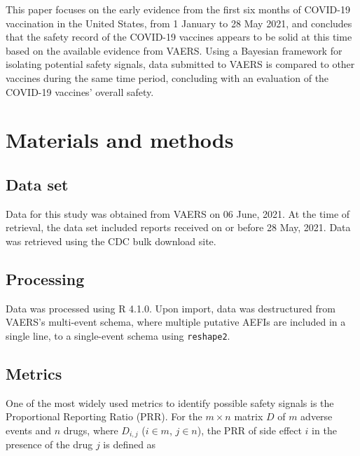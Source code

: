 \documentclass[preprints,communication,submit,oneauthor,pdftex]{Definitions/mdpi}
\begin{document}
This paper focuses on the early evidence from the first six months of COVID-19 vaccination in the United States, from 1 January to 28 May 2021, and concludes that the safety record of the COVID-19 vaccines appears to be solid at this time based on the available evidence from VAERS. Using a Bayesian framework for isolating potential safety signals, data submitted to VAERS is compared to other vaccines during the same time period, concluding with an evaluation of the COVID-19 vaccines' overall safety.


\section{Materials and methods} %
\label{sec:methods}

\subsection{Data set} %
\label{sub:data_set}

Data for this study was obtained from VAERS on 06 June, 2021. At the time of retrieval, the data set included reports received on or before 28 May, 2021. Data was retrieved using the CDC bulk download site.


\subsection{Processing} %
\label{sub:processing}


Data was processed using R 4.1.0\cite{rstats}. Upon import, data was destructured from VAERS's multi-event schema, where multiple putative AEFIs are included in a single line, to a single-event schema using \texttt{reshape2}.\cite{wickham2012reshape2} 


\subsection{Metrics} %
\label{sub:metrics}

One of the most widely used metrics to identify possible safety signals is the Proportional Reporting Ratio (PRR).\cite{evans2001use} For the $m \times n$ matrix $D$ of $m$ adverse events and $n$ drugs, where $D_{i,j}$ ($i \in m$, $j \in n$), the PRR of side effect $i$ in the presence of the drug $j$ is defined as
\end{document}
